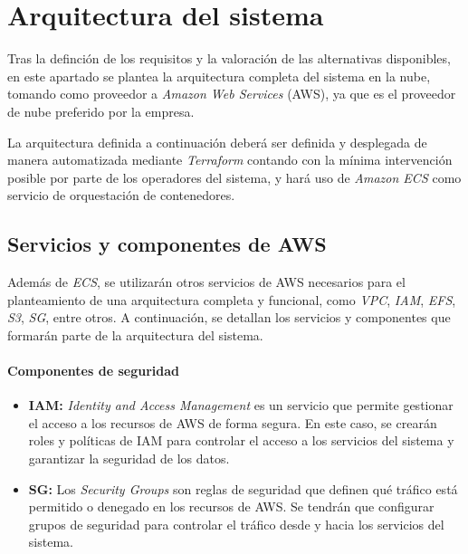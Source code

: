 \section{Arquitectura del sistema}\label{sec:arquitectura}
Tras la definción de los requisitos y la valoración de las alternativas
disponibles, en este apartado se plantea la arquitectura completa del sistema
en la nube, tomando como proveedor a \textit{Amazon Web Services} (AWS), ya que
es el proveedor de nube preferido por la empresa.

La arquitectura definida a continuación deberá ser definida y desplegada de
manera automatizada mediante \textit{Terraform} contando con la mínima
intervención posible por parte de los operadores del sistema, y hará uso de
\textit{Amazon ECS} como servicio de orquestación de contenedores.


\subsection{Servicios y componentes de AWS}\label{subsec:servicios}
Además de \textit{ECS}, se utilizarán otros servicios de AWS necesarios para el
planteamiento de una arquitectura completa y funcional, como \textit{VPC},
\textit{IAM}, \textit{EFS}, \textit{S3}, \textit{SG}, entre otros. A
continuación, se detallan los servicios y componentes que formarán parte de la
arquitectura del sistema.

\paragraph{Componentes de seguridad}
\begin{itemize}
	\item \textbf{IAM:} \textit{Identity and Access Management} es un servicio
		que permite gestionar el acceso a los recursos de AWS de forma segura.
		En este caso, se crearán roles y políticas de IAM para controlar el
		acceso a los servicios del sistema y garantizar la seguridad de los
		datos.
	\item \textbf{SG:} Los \textit{Security Groups} son reglas de seguridad que
		definen qué tráfico está permitido o denegado en los recursos de AWS.
		Se tendrán que configurar grupos de seguridad para controlar el tráfico
		desde y hacia los servicios del sistema.
\end{itemize}

\newpage{}
